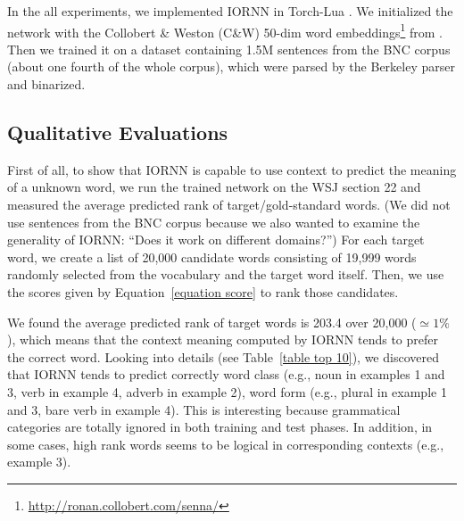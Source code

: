 \documentclass[11pt]{article}
\begin{document}
In the all experiments, we implemented IORNN in Torch-Lua \cite{collobert_implementing_2012}.
We initialized the network with the Collobert \& Weston (C\&W) 50-dim word embeddings\footnote{\url{http://ronan.collobert.com/senna/}} 
from . Then we trained it on a dataset containing 1.5M sentences
from the BNC corpus (about one fourth of the whole corpus), which were parsed by 
the Berkeley parser \cite{petrov2006learning} and binarized.

\subsection{Qualitative Evaluations}
\label{subsection qualitative eval}

First of all, to show that IORNN is capable to use context to predict the meaning of a unknown word, 
we run the trained network on the WSJ section 22 and measured the average predicted rank of 
target/gold-standard words. 
(We did not use sentences from the BNC corpus because we also wanted to examine the generality of IORNN: 
``Does it work on different domains?'')
For each target word, we create a list of 20,000 candidate words 
consisting of 19,999 words randomly selected from the vocabulary and the target word itself. Then, 
we use the scores given by Equation~\ref{equation score} to rank those candidates. 

We found the average predicted rank of target words is 203.4 over 20,000 ($\simeq 1\%$), which means that 
the context meaning computed by IORNN tends to prefer the correct word. Looking into details 
(see Table~\ref{table top 10}), we discovered that IORNN tends to predict correctly word class (e.g., 
noun in examples 1 and 3, verb in example 4, adverb in example 2), word form (e.g., plural in example 1 and 3, 
bare verb in example 4). This is interesting because grammatical categories are totally ignored in both training 
and test phases. In addition, in some cases, high rank words seems to be logical in corresponding 
contexts (e.g., example 3).
\end{document}
